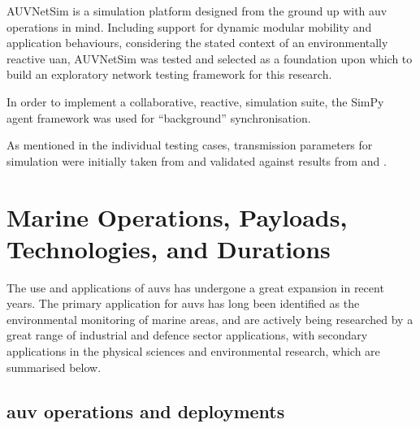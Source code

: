 AUVNetSim is a simulation platform designed from the ground up with \gls{auv} operations in mind\cite{Miquel2008}.
Including support for dynamic modular mobility and application behaviours, considering the stated context of an environmentally reactive \gls{uan}, AUVNetSim was tested and selected as a foundation upon which to build an exploratory network testing framework for this research.

In order to implement a collaborative, reactive, simulation suite, the SimPy~\cite{Muller2003SimPy} agent framework was used for ``background'' synchronisation.

As mentioned in the individual testing cases, transmission parameters for simulation were initially taken from and validated against results from \citet{Stojanovic2007} and \citet{Stefanov2011}.


\begin{comment}
\subsection{Routing and Network Design for \glspl{uan}}

Forward Error Correction coding is used on such channels to minimise packet losses.

\todo{ADD:Summary of Akyildiz02/05}

\todo{FIX:callback to routing discussion in c1 explain why fbr is the best of everything all the time}
\end{comment}

\section{Marine Operations, Payloads, Technologies, and Durations}\label{sec:marine_ops}

The use and applications of \glspl{auv} has undergone a great expansion in recent years\cite{Alam2014}.
The primary application for \glspl{auv} has long been identified as the environmental monitoring of marine areas, and are actively being researched by a great range of industrial and defence sector applications, with secondary applications in the physical sciences and environmental research, which are summarised below\cite{Bingham2002,Wynn2014}.

\subsection{\gls{auv} operations and deployments}

